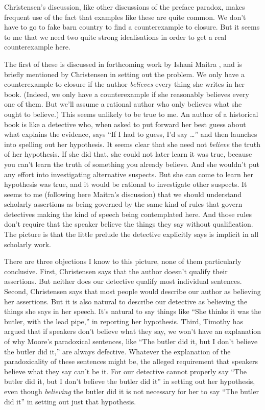 Christensen's discussion, like other discussions of the preface paradox, makes frequent use of the fact that examples like these are quite common. We don't have to go to fake barn country to find a counterexample to closure. But it seems to me that we need two quite strong idealisations in order to get a real counterexample here.

The first of these is discussed in forthcoming work by Ishani Maitra \citep{MaitraANG}, and is briefly mentioned by Christensen in setting out the problem. We only have a counterexample to closure if the author \textit{believes} every thing she writes in her book. (Indeed, we only have a counterexample if she reasonably believes every one of them. But we'll assume a rational author who only believes what she ought to believe.) This seems unlikely to be true to me. An author of a historical book is like a detective who, when asked to put forward her best guess about what explains the evidence, says ``If I had to guess, I'd say {\dots}'' and then launches into spelling out her hypothesis. It seems clear that she need not \textit{believe} the truth of her hypothesis. If she did that, she could not later learn it was true, because you can't learn the truth of something you already believe. And she wouldn't put any effort into investigating alternative suspects. But she can come to learn her hypothesis was true, and it would be rational to investigate other suspects. It seems to me (following here Maitra's discussion) that we should understand scholarly assertions as being governed by the same kind of rules that govern detectives making the kind of speech being contemplated here. And those rules don't require that the speaker believe the things they say without qualification. The picture is that the little prelude the detective explicitly says is implicit in all scholarly work.

There are three objections I know to this picture, none of them particularly conclusive. First, Christensen says that the author doesn't qualify their assertions. But neither does our detective qualify most individual sentences. Second, Christensen says that most people would describe our author as believing her assertions. But it is also natural to describe our detective as believing the things she says in her speech. It's natural to say things like ``She thinks it was the butler, with the lead pipe,'' in reporting her hypothesis. Third, Timothy \cite{Williamson2000-WILKAI} has argued that if speakers don't believe what they say, we won't have an explanation of why Moore's paradoxical sentences, like ``The butler did it, but I don't believe the butler did it,'' are always defective. Whatever the explanation of the paradoxicality of these sentences might be, the alleged requirement that speakers believe what they say can't be it. For our detective cannot properly say ``The butler did it, but I don't believe the butler did it'' in setting out her hypothesis, even though \textit{believing} the butler did it is not necessary for her to say ``The butler did it'' in setting out just that hypothesis.

